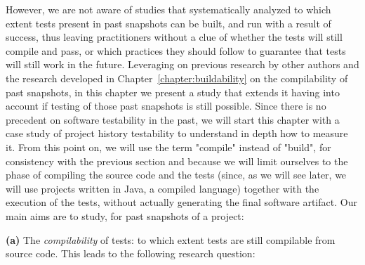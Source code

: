 

However, we are not aware of studies that systematically analyzed to which extent tests present in past snapshots can be built, and run with a result of success, thus leaving practitioners without a clue of whether the tests will still compile and pass, or which practices they should follow to guarantee that tests will still work in the future.
Leveraging on previous research by other authors and the research developed in Chapter~\ref{chapter:buildability} on the compilability of past snapshots, in this chapter we present a study that extends it having into account if testing of those past snapshots is still possible. 
Since there is no precedent on software testability in the past, we will start this chapter with a case study of project history testability to understand in depth how to measure it.
From this point on, we will use the term "compile" instead of "build", for consistency with the previous section and because we will limit ourselves to the phase of compiling the source code and the tests (since, as we will see later, we will use projects written in Java, a compiled language) together with the execution of the tests, without actually generating the final software artifact.
Our main aims are to study, for past snapshots of a project:


\textbf{(a)} The \textit{compilability} of tests: to which extent tests are still compilable from source code. 
This leads to the following research question:

